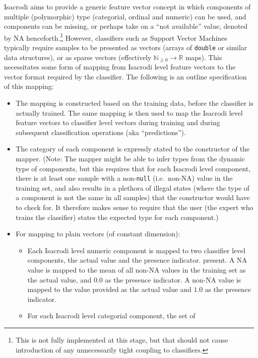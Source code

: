 \documentclass[a4paper,fleqn]{article}
\newcommand{\computercode}[1]{\texttt{#1}}
\begin{document}
Isacrodi aims to provide a generic feature vector concept in which
components of multiple (polymorphic) type (categorial, ordinal and
numeric) can be used, and components can be missing, or perhaps take
on a ``not available'' value, denoted by NA henceforth.\footnote{This
  is not fully implemented at this stage, but that should not cause
  introduction of any unnecessarily tight coupling to classifiers.}
However, classifiers such as Support Vector Machines typically require
samples to be presented as vectors (arrays of \computercode{double} or
similar data structures), or as sparse vectors (effectively
$\mathds{N}_{\ge 0} \rightarrow \mathds{R}$ maps). This necessitates
some form of mapping from Isacrodi level feature vectors to the vector
format required by the classifier. The following is an outline
specification of this mapping:
\begin{itemize}
\item The mapping is constructed based on the training data, before
  the classifier is actually trained. The same mapping is then used to
  map the Isacrodi level feature vectors to classifier level vectors
  during training and during subsequent classification operations (aka
  ``predictions'').
\item The category of each component is expressly stated to the
  constructor of the mapper. (Note: The mapper might be able to infer
  types from the dynamic type of components, but this requires that
  for each Isacrodi level component, there is at least one sample with
  a non-\computercode{null} (i.e.\ non-NA) value in the training set,
  and also results in a plethora of illegal states (where the type of
  a component is not the same in all samples) that the constructor
  would have to check for. It therefore makes sense to require that
  the user (the expert who trains the classifier) states the expected
  type for each component.)
\item For mapping to plain vectors (of constant dimension):
  \begin{itemize}
  \item Each Isacrodi level numeric component is mapped to two
    classifier level components, the actual value and the presence
    indicator.  present. A NA value is mapped to the mean of all
    non-NA values in the training set as the actual value, and $0.0$
    as the presence indicator. A non-NA value is mapped to the value
    provided as the actual value and $1.0$ as the presence indicator.
  \item For each Isacrodi level categorial component, the set of

\end{itemize}
\end{itemize}
\end{document}
